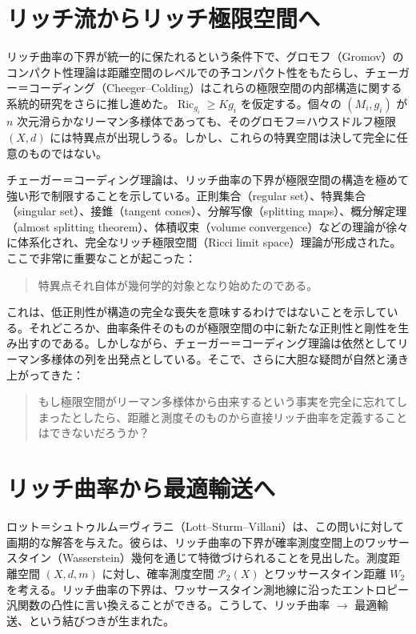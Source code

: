 \documentclass[lualatex]{ltjsarticle}
\begin{document}
\section{リッチ流からリッチ極限空間へ}

リッチ曲率の下界が統一的に保たれるという条件下で、グロモフ（Gromov）のコンパクト性理論は距離空間のレベルでの予コンパクト性をもたらし、チェーガー＝コーディング（Cheeger--Colding）はこれらの極限空間の内部構造に関する系統的研究をさらに推し進めた。$\operatorname{Ric}_{g_i} \geq K g_i$ を仮定する。個々の $(M_i,g_i)$ が $n$ 次元滑らかなリーマン多様体であっても、そのグロモフ＝ハウスドルフ極限 $(X,d)$ には特異点が出現しうる。しかし、これらの特異空間は決して完全に任意のものではない。

チェーガー＝コーディング理論は、リッチ曲率の下界が極限空間の構造を極めて強い形で制限することを示している。正則集合（regular set）、特異集合（singular set）、接錐（tangent cones）、分解写像（splitting maps）、概分解定理（almost splitting theorem）、体積収束（volume convergence）などの理論が徐々に体系化され、完全なリッチ極限空間（Ricci limit space）理論が形成された。ここで非常に重要なことが起こった：

\begin{quote}
特異点それ自体が幾何学的対象となり始めたのである。
\end{quote}

これは、低正則性が構造の完全な喪失を意味するわけではないことを示している。それどころか、曲率条件そのものが極限空間の中に新たな正則性と剛性を生み出すのである。しかしながら、チェーガー＝コーディング理論は依然としてリーマン多様体の列を出発点としている。そこで、さらに大胆な疑問が自然と湧き上がってきた：

\begin{quote}
もし極限空間がリーマン多様体から由来するという事実を完全に忘れてしまったとしたら、距離と測度そのものから直接リッチ曲率を定義することはできないだろうか？
\end{quote}

\section{リッチ曲率から最適輸送へ}

ロット＝シュトゥルム＝ヴィラニ（Lott--Sturm--Villani）は、この問いに対して画期的な解答を与えた。彼らは、リッチ曲率の下界が確率測度空間上のワッサースタイン（Wasserstein）幾何を通じて特徴づけられることを見出した。測度距離空間 $(X,d,m)$ に対し、確率測度空間 $\mathcal{P}_2(X)$ とワッサースタイン距離 $W_2$ を考える。リッチ曲率の下界は、ワッサースタイン測地線に沿ったエントロピー汎関数の凸性に言い換えることができる。こうして、リッチ曲率 $\longrightarrow$ 最適輸送、という結びつきが生まれた。
\end{document}
